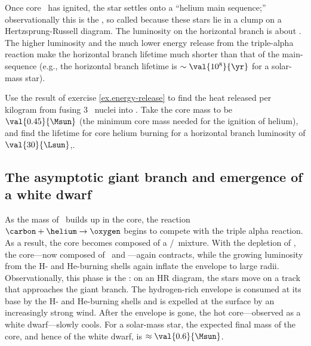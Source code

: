 Once core \helium\ has ignited, the star settles onto a ``helium main sequence;'' observationally this is the , so called because these stars lie in a clump on a Hertzsprung-Russell diagram. The luminosity on the horizontal branch is about . The higher luminosity and the much lower energy release from the triple-alpha reaction make the horizontal branch lifetime much shorter than that of the main-sequence (e.g., the horizontal branch lifetime is $\sim \val{10^{8}}{\yr}$ for a solar-mass star).

\begin{exercisebox}
Use the result of exercise \ref{ex.energy-release} to find the heat released per kilogram from fusing 3 \helium\ nuclei into \carbon. Take the core mass to be $\val{0.45}{\Msun}$ (the minimum core mass needed for the ignition of helium), and find the lifetime for core helium burning for a horizontal branch luminosity of $\val{30}{\Lsun}$,.
\end{exercisebox}

\subsection{The asymptotic giant branch and emergence of a white dwarf}

As the mass of \carbon\ builds up in the core, the reaction $\carbon+\helium\to\oxygen$ begins to compete with the triple alpha reaction. As a result, the core becomes composed of a \carbon/\oxygen\ mixture.
With the depletion of \helium, the core---now composed of \carbon\ and \oxygen---again contracts, while the growing luminosity from the H- and He-burning shells again inflate the envelope to large radii. Observationally, this phase is the : on an HR diagram, the stars move on a track that approaches the giant branch. The hydrogen-rich envelope is consumed at its base by the H- and He-burning shells and is expelled at the surface by an increasingly strong wind. After the envelope is gone, the hot core---observed as a white dwarf---slowly cools. For a solar-mass star, the expected final mass of the core, and hence of the white dwarf, is $\approx\val{0.6}{\Msun}$.

